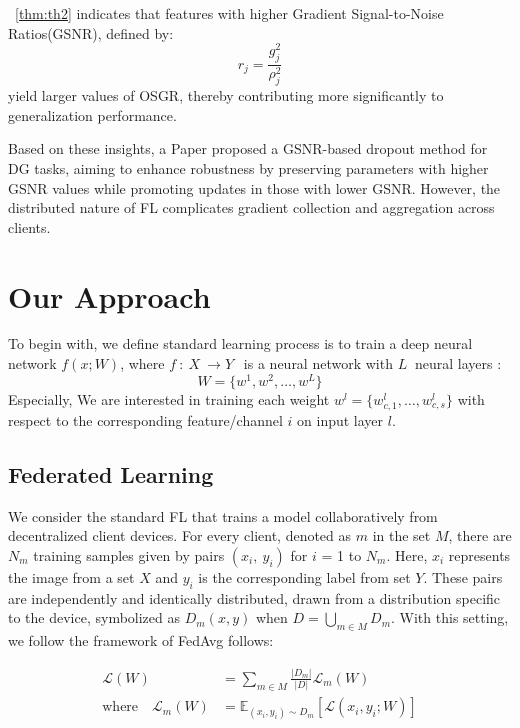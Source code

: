 \documentclass{article}
\theoremstyle{plain}
\theoremstyle{definition}
\theoremstyle{remark}
\begin{document}
~\cref{thm:th2} indicates that features with higher Gradient Signal-to-Noise Ratios(GSNR), defined by:
\begin{equation}
r_j = \frac{g_j^2}{\rho_j^2}
\label{eq:gsnr}
\end{equation}
yield larger values of OSGR, thereby contributing more significantly to generalization performance.

Based on these insights, a Paper \cite{adg} proposed a GSNR-based dropout method for DG tasks, aiming to enhance robustness by preserving parameters with higher GSNR values while promoting updates in those with lower GSNR. However, the distributed nature of FL complicates gradient collection and aggregation across clients.

\section{Our Approach}

To begin with, we define standard learning process is to train a deep neural network $f \left( x; W \right)$, where $f\ :\ X\ \rightarrow Y\ \ $ is a neural network with $L\ $ neural layers :
\begin{equation}
W = \{w^1, w^2, \ldots, w^L\}
    \label{eq:network}
\end{equation}
Especially, We are interested in training each weight  $w^l = \{ w_{c,1}^{l}, \ldots, w_{c,s}^{l} \}$ with respect to the corresponding feature/channel $i$ on input layer $l$.

\subsection{Federated Learning}
We consider the standard FL that trains a model collaboratively from decentralized client devices. For every client, denoted as ${m}$ in the set $M$, there are $N_m$ training samples given by pairs $\left(x_i,\ y_i\right)$ for $i$ = 1 to $N_m$. Here, $x_i$ represents the image from a set $X$ and $y_i$ is the corresponding label from set $Y$. These pairs are independently and identically distributed, drawn from a distribution specific to the device, symbolized as $D_m\left(x,y\right)$ when $D=\bigcup_{m\in M}D_m$. With this setting, we follow the framework of FedAvg follows:

 \begin{equation}
\begin{aligned}
\mathcal{L}(W) &= \sum_{m \in M} \frac{|D_m|}{|D|} \mathcal{L}_m(W) \\
\text{where} \quad 
\mathcal{L}_m(W) &= \mathbb{E}_{(x_i, y_i) \sim D_m} \left[ \mathcal{L}(x_i, y_i; W) \right]
\end{aligned}
\end{equation}
\end{document}
